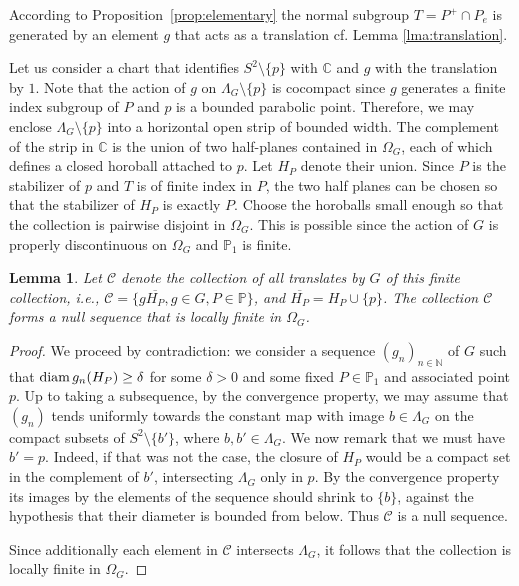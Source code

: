 \documentclass[11pt]{article}
\newtheorem{lemma}[theorem]{Lemma}
\theoremstyle{definition}
\newcommand\CCC{\mathcal{C}}
\begin{document}
According to Proposition~\ref{prop:elementary} 
the normal subgroup $T=P^+\cap P_e$ is generated by an element $g$ that acts as a translation cf. Lemma \ref{lma:translation}.

Let us consider a chart that identifies $S^2\setminus\{p\}$ with $\mathbb{C}$ and $g$ with the translation by $1$. Note that the action of $g$ on $\Lambda_G\setminus\{p\}$ is cocompact since
$g$ generates a finite index subgroup of $P$ and $p$ is a bounded parabolic point. Therefore, we may enclose $\Lambda_G\setminus\{p\}$ into a horizontal open strip of bounded width. 
The complement of the strip in $\mathbb{C}$ is the union of two half-planes contained in $\Omega_G$, each of which defines a closed horoball attached to $p$. 
Let $H_P$ denote their union. Since $P$ is the stabilizer of $p$ and $T$ is of finite index in $P$,  the two half planes can be chosen so that the stabilizer of $H_P$ is exactly $P$.
Choose the horoballs small enough so that the collection is pairwise disjoint in $\Omega_G$. This is possible since the action of $G$ is properly discontinuous on $\Omega_G$ and $\mathbb{P}_1$ is finite.

\medskip

\begin{lemma}\label{lma:Cnull} Let $\CCC$ denote the collection of all translates by $G$ of this finite collection, i.e., $\CCC= \{g\overline{H_P}, g \in G, P \in \mathbb{P} \} $, and $\overline{H_P}=H_P\cup\{p\}$.  The collection $\CCC$ forms a null sequence that is locally finite in $\Omega_G$.\end{lemma}

\begin{proof} We proceed by contradiction: we consider a sequence $(g_n)_{n \in \mathbb{N}}$ of $G$ such that $\hbox{\rm diam}\,g_n(H_P)\ge \delta$ for some $\delta>0$ and some fixed $P\in\mathbb{P}_1$ and associated point $p$. 
Up to taking a subsequence, by the convergence property, we may assume that $(g_n)$ tends uniformly towards 
the constant map with image $b\in\Lambda_G$
on the compact subsets of $S^2\setminus \{b'\}$, 
where $b,b'\in\Lambda_G$. 
We now remark that we must have $b'=p$. Indeed, if that was not the case, the closure of $H_P$ would be a compact set in the complement of $b'$, intersecting $\Lambda_G$ only in $p$. By the convergence property its images by the elements of the sequence should shrink to $\{b\}$, against the hypothesis that their diameter is bounded from below. Thus $\CCC$ is a null sequence.

Since additionally each element in $\CCC$ intersects $\Lambda_G$, it follows that the collection is locally finite in $\Omega_G$.
\end{proof}
\end{document}
